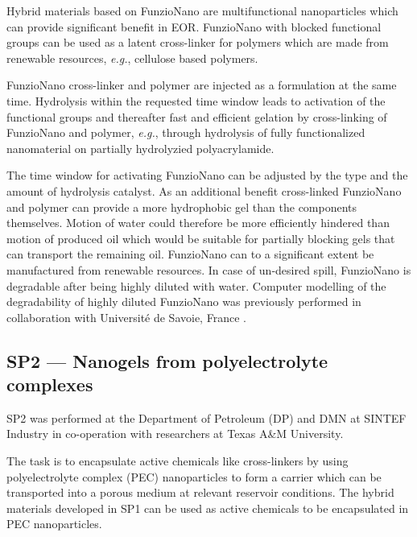 Hybrid materials  based on FunzioNano are multifunctional nanoparticles which can provide significant benefit in EOR. FunzioNano with blocked functional groups can be used as a latent cross-linker for polymers which are made from renewable resources, \textit{e.g.}, cellulose based polymers. 

FunzioNano cross-linker and polymer are injected as a formulation at the same time. Hydrolysis within the requested time window leads to activation of the functional groups and thereafter fast and efficient gelation by cross-linking  of FunzioNano and polymer, \textit{e.g.}, through hydrolysis  of fully functionalized nanomaterial on partially hydrolyzied polyacrylamide. 

The time window  for activating FunzioNano can be adjusted by the type and the amount of hydrolysis catalyst. As an additional benefit cross-linked FunzioNano and polymer can provide a more hydrophobic gel than the components themselves. Motion of water could therefore be more efficiently hindered than motion of produced oil which would be suitable for partially blocking gels that can transport the remaining oil. FunzioNano can to a significant extent be manufactured from renewable resources. In case of un-desired spill, FunzioNano is degradable  after being highly diluted with water. Computer modelling of the degradability of highly diluted FunzioNano was previously performed in collaboration with Université de Savoie, France \citep{Neyertz2012,Neyertz2013}.

\subsection*{SP2 --- Nanogels from polyelectrolyte complexes}

SP2 was performed at the Department of Petroleum (DP) and DMN at SINTEF Industry in co-operation with researchers at Texas A\&M University.

The task is to encapsulate active chemicals like cross-linkers by using polyelectrolyte complex  (PEC) nanoparticles to form a carrier which can be transported into a porous medium at relevant reservoir conditions. The hybrid materials developed in SP1 can be used as active chemicals to be encapsulated in PEC nanoparticles. 


